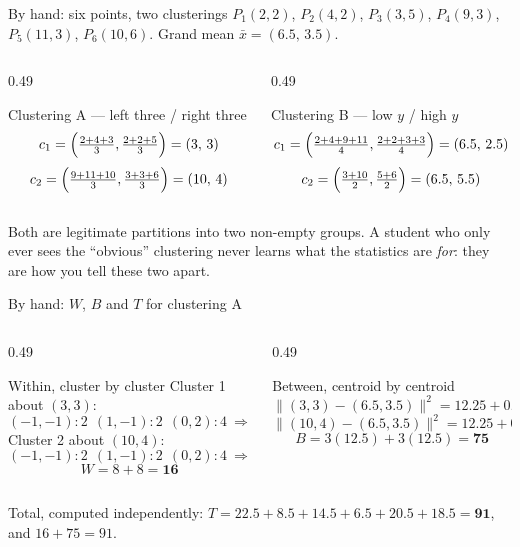 \documentclass[aspectratio=169]{beamer}
\begin{document}
\begin{frame}[shrink=4]{By hand: six points, two clusterings}
  $P_1(2,2)$, $P_2(4,2)$, $P_3(3,5)$, $P_4(9,3)$, $P_5(11,3)$, $P_6(10,6)$.
  Grand mean $\bar{x} = (6.5,\, 3.5)$.
  \begin{columns}[T]
    \begin{column}{0.49\textwidth}
      \begin{block}{Clustering A --- left three / right three}
        \[ c_1 = \Bigl(\tfrac{2+4+3}{3}, \tfrac{2+2+5}{3}\Bigr) = (3,\,3) \]
        \[ c_2 = \Bigl(\tfrac{9+11+10}{3}, \tfrac{3+3+6}{3}\Bigr) = (10,\,4) \]
      \end{block}
    \end{column}
    \begin{column}{0.49\textwidth}
      \begin{block}{Clustering B --- low $y$ / high $y$}
        \[ c_1 = \Bigl(\tfrac{2+4+9+11}{4}, \tfrac{2+2+3+3}{4}\Bigr)
             = (6.5,\,2.5) \]
        \[ c_2 = \Bigl(\tfrac{3+10}{2}, \tfrac{5+6}{2}\Bigr) = (6.5,\,5.5) \]
      \end{block}
    \end{column}
  \end{columns}
  \begin{center}\small
    Both are legitimate partitions into two non-empty groups. A student who
    only ever sees the ``obvious'' clustering never learns what the
    statistics are \emph{for}: they are how you tell these two apart.
  \end{center}
\end{frame}

\begin{frame}[shrink=8]{By hand: $W$, $B$ and $T$ for clustering A}
  \begin{columns}[T]
    \begin{column}{0.49\textwidth}
      \begin{block}{Within, cluster by cluster}
        Cluster 1 about $(3,3)$:
        \[ (-1,-1)\!:2 \ \ (1,-1)\!:2 \ \ (0,2)\!:4 \ \Rightarrow\ 8 \]
        Cluster 2 about $(10,4)$:
        \[ (-1,-1)\!:2 \ \ (1,-1)\!:2 \ \ (0,2)\!:4 \ \Rightarrow\ 8 \]
        \[ W = 8 + 8 = \mathbf{16} \]
      \end{block}
    \end{column}
    \begin{column}{0.49\textwidth}
      \begin{block}{Between, centroid by centroid}
        \[ \lVert (3,3)-(6.5,3.5)\rVert^2 = 12.25 + 0.25 = 12.5 \]
        \[ \lVert (10,4)-(6.5,3.5)\rVert^2 = 12.25 + 0.25 = 12.5 \]
        \[ B = 3(12.5) + 3(12.5) = \mathbf{75} \]
      \end{block}
    \end{column}
  \end{columns}
  \vspace{0.2em}
  \begin{exampleblock}{}
    \centering
    Total, computed independently:
    $T = 22.5 + 8.5 + 14.5 + 6.5 + 20.5 + 18.5 = \mathbf{91}$,
    \quad and $16 + 75 = 91$. \checkmark
  \end{exampleblock}
\end{frame}
\end{document}
